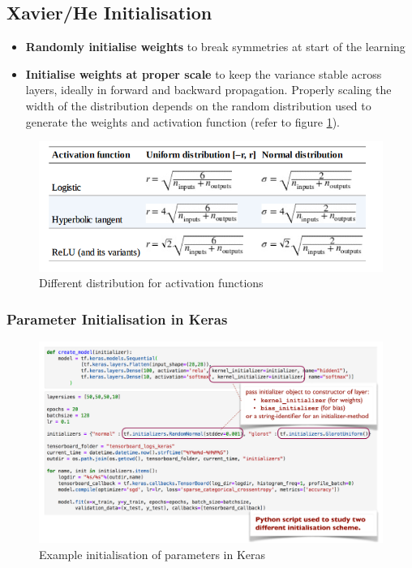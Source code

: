 \documentclass[11pt]{article}
\begin{document}
\subsection{Xavier/He Initialisation}
\begin{itemize}
	\item \textbf{Randomly initialise weights} to break symmetries at start of the learning
	\item \textbf{Initialise weights at proper scale} to keep the variance stable across layers, ideally in forward and backward propagation. Properly scaling the width of the distribution depends on the random distribution used to generate the weights and activation function (refer to figure \ref{fig:activationfunctiondistributions}).
\end{itemize}

\begin{figure}[tbh]
	\centering
	\includegraphics[width=0.6\linewidth, keepaspectratio]{activation_function_distributions}
	\caption{Different distribution for activation functions}
	\label{fig:activationfunctiondistributions}
\end{figure}

\subsubsection{Parameter Initialisation in Keras}
\begin{figure}[H]
	\centering
	\includegraphics[width=0.7\linewidth]{parameter_initialisation_in_keras}
	\caption{Example initialisation of parameters in Keras}
	\label{fig:parameterinitialisationinkeras}
\end{figure}
\end{document}
